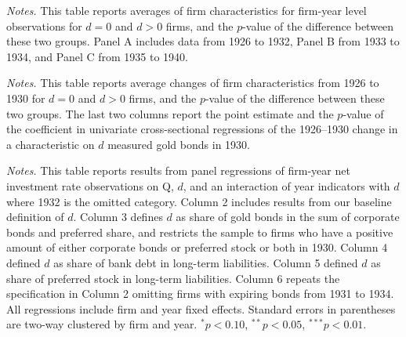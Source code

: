 \begin{table}[p]\centering
\caption{\\ Average characteristics for $d = 0$ and $d > 0$ firms}\scriptsize
\label{tabapp:bonds}
  


\vspace*{3mm} \justifying \noindent
\scriptsize{\textit{Notes.} This table reports averages of firm characteristics for firm-year level observations for $d = 0$ and $d > 0$ firms, and the $p$-value of the difference between these two groups. Panel A includes data from 1926 to 1932, Panel B from 1933 to 1934, and Panel C from 1935 to 1940.}
\end{table}

\begin{table}[p]\centering
\caption{\\ Average characteristics for $d = 0$ and $d > 0$ firms}\scriptsize
\label{tab:pretrend}  


\vspace*{3mm} \justifying \noindent
\scriptsize{\textit{Notes.} This table reports average changes of firm characteristics from 1926 to 1930 for $d = 0$ and $d > 0$ firms, and the $p$-value of the difference between these two groups. The last two columns report the point estimate and the $p$-value of the coefficient in univariate cross-sectional regressions of the 1926--1930 change in a characteristic on $d$  measured gold bonds in 1930.}
\end{table}

\begin{table}[p]\centering
\caption{\\ Leverage and investment} \scriptsize   
\label{tab:inv_main}  \renewcommand{\arraystretch}{1.2}



\vspace*{3mm} \justifying \noindent
\scriptsize{\textit{Notes.} This table reports results from panel regressions of firm-year net investment rate observations on Q, $d$, and an interaction of year indicators with $d$ where 1932 is the omitted category. Column 2 includes results from our baseline definition of $d$. Column 3 defines $d$ as share of gold bonds in the sum of corporate bonds and preferred share, and restricts the sample to firms who have a positive amount of either corporate bonds or preferred stock or both in 1930. Column 4 defined $d$ as share of bank debt in long-term liabilities. Column 5 defined $d$ as share of preferred stock in long-term liabilities. Column 6 repeats the specification in Column 2 omitting firms with expiring bonds from 1931 to 1934. All regressions include firm and year fixed effects. Standard errors in parentheses are two-way clustered by firm and year. $^{*}p<0.10$, $^{**}p<0.05$, $^{***}p<0.01$.}
\end{table}

